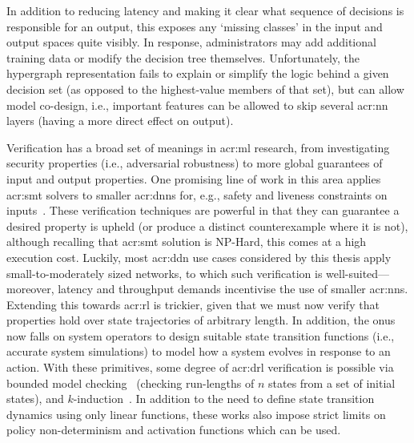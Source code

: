 In addition to reducing latency and making it clear what sequence of decisions is responsible for an output, this exposes any `missing classes' in the input and output spaces quite visibly.
In response, administrators may add additional training data or modify the decision tree themselves.
Unfortunately, the hypergraph representation fails to explain or simplify the logic behind a given decision set (as opposed to the highest-value members of that set), but can allow model co-design, i.e., important features can be allowed to skip several \gls{acr:nn} layers (having a more direct effect on output).

Verification has a broad set of meanings in \gls{acr:ml} research, from investigating security properties (i.e., adversarial robustness) to more global guarantees of input and output properties.
One promising line of work in this area applies \gls{acr:smt} solvers to smaller \glspl{acr:dnn} for, e.g., safety and liveness constraints on inputs~\parencite{DBLP:conf/cav/KatzBDJK17,DBLP:conf/cav/KatzHIJLLSTWZDK19}.
These verification techniques are powerful in that they can guarantee a desired property is upheld (or produce a distinct counterexample where it is not), although recalling that \gls{acr:smt} solution is \textsf{NP}-Hard, this comes at a high execution cost.
Luckily, most \gls{acr:ddn} use cases considered by this thesis apply small-to-moderately sized networks, to which such verification is well-suited---moreover, latency and throughput demands incentivise the use of smaller \glspl{acr:nn}.
Extending this towards \gls{acr:rl} is trickier, given that we must now verify that properties hold over state trajectories of arbitrary length.
In addition, the onus now falls on system operators to design suitable state transition functions (i.e., accurate system simulations) to model how a system evolves in response to an action.
With these primitives, some degree of \gls{acr:drl} verification is possible via bounded model checking~\parencite{DBLP:conf/sigcomm/KazakBKS19,DBLP:conf/sigcomm/EliyahuKKS21} (checking run-lengths of $n$ states from a set of initial states), and $k$-induction~\parencite{drl-verification-2}.
In addition to the need to define state transition dynamics using only linear functions, these works also impose strict limits on policy non-determinism and activation functions which can be used.

